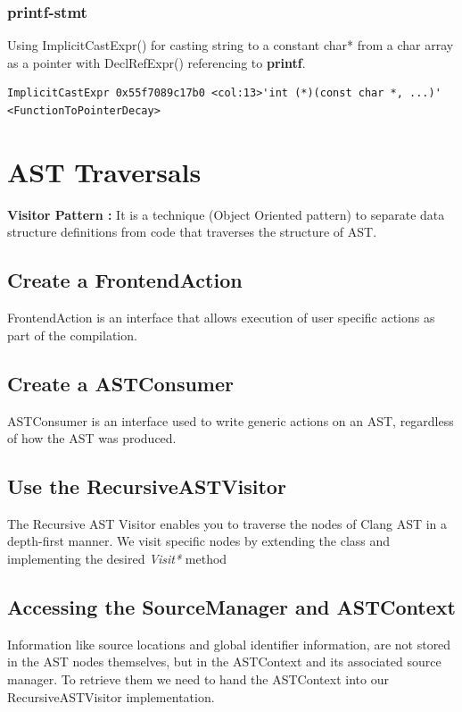 \documentclass{article}
\begin{document}
\subsubsection{printf-stmt}
Using ImplicitCastExpr() for casting string to a constant char* from a char array as a pointer with DeclRefExpr() referencing to \textbf{printf}.
\begin{verbatim}
ImplicitCastExpr 0x55f7089c17b0 <col:13>'int (*)(const char *, ...)'
<FunctionToPointerDecay>
\end{verbatim}

\section{AST Traversals}
\textbf{Visitor Pattern :} It is a technique (Object Oriented pattern) to separate data structure definitions from code that traverses the structure of AST.

\subsection{Create a FrontendAction}
FrontendAction is an interface that allows execution of user specific actions as part of the compilation. 

\subsection{Create a ASTConsumer}
ASTConsumer is an interface used to write generic actions on an AST, regardless of how the AST was produced.

\subsection{Use the RecursiveASTVisitor}
The Recursive AST Visitor enables you to traverse the nodes of Clang AST in a depth-first manner. We visit specific nodes by extending the class and implementing the desired \textit{Visit*} method

\subsection{Accessing the SourceManager and ASTContext}
Information like source locations and global identifier information, are not stored in the AST nodes themselves, but in the ASTContext and its associated source manager. To retrieve them we need to hand the ASTContext into our RecursiveASTVisitor implementation.
\end{document}
